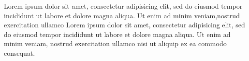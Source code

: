 \documentclass{book}
\begin{document}
\let\parledgroupnotespacing\singlespacing


\begin{pages}


\begin{Leftside}
\beginnumbering
\pstart
\begin{ledgroup}
{%
Lorem ipsum dolor sit amet, consectetur adipisicing elit, sed do eiusmod tempor incididunt ut labore et dolore magna aliqua. Ut enim ad minim veniam,nostrud exercitation ullamco  
Lorem ipsum dolor sit amet, consectetur adipisicing elit, sed do eiusmod tempor incididunt ut labore et dolore magna aliqua. Ut enim ad minim veniam, nostrud exercitation ullamco  nisi ut aliquip ex ea commodo consequat.}
\end{ledgroup}
\pend



\end{Leftside}
\end{pages}
\end{document}
